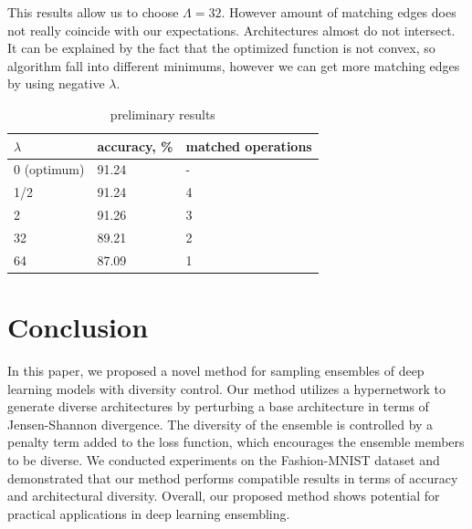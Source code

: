 \documentclass{article}
\begin{document}
This results allow us to choose $\Lambda = 32$. However amount of matching edges does not really coincide with our expectations. Architectures almost do not intersect. It can be explained by the fact that the optimized function is not convex, so algorithm fall into different minimums, however we can get more matching edges by using negative $\lambda$. 

\begin{table}[h   ]
	\caption{preliminary results}
	\centering
	\begin{tabular}{lll}

		\midrule
		$\lambda$     & accuracy, \% & matched operations \\
		\midrule
        0 (optimum) & 91.24 & - \\ 
        1/2  & 91.24 &  4   \\
		2  & 91.26   &  3   \\
		32 & 89.21   &  2   \\
		64 & 87.09   &  1   \\
		\bottomrule
	\end{tabular}
	\label{tab:prelim}
\end{table}


\section{Conclusion}

In this paper, we proposed a novel method for sampling ensembles of deep learning models with diversity control. Our method utilizes a hypernetwork to generate diverse architectures by perturbing a base architecture in terms of Jensen-Shannon divergence. The diversity of the ensemble is controlled by a penalty term added to the loss function, which encourages the ensemble members to be diverse. We conducted experiments on the Fashion-MNIST dataset and demonstrated that our method performs compatible results in terms of accuracy and architectural diversity. Overall, our proposed method shows potential for practical applications in deep learning ensembling.


\end{document}
